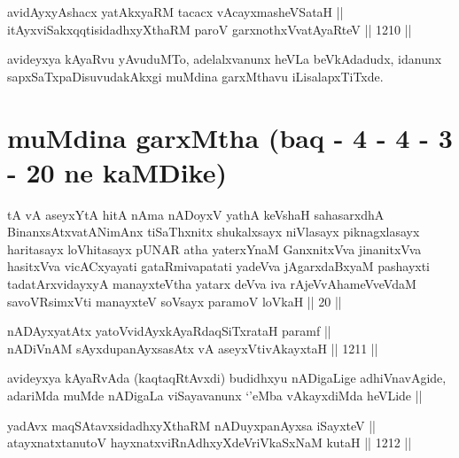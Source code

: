 
\begin{shl}
avidAyxyAshacx yatAkxyaRM tacacx vAcayxmasheVSataH || \\
itAyxviSakxqqtisidadhxyXthaRM paroV garxnothxV\s vatAyaRteV ||  1210 ||  
\end{shl}

\begin{artha}
avideyxya kAyaRvu yAvuduMTo, adelalxvanunx heVLa beVkAdadudx, idanunx sapxSaTxpaDisuvudakAkxgi muMdina garxMthavu iLisalapxTiTxde.
\end{artha}

\section*{muMdina garxMtha (baq - 4 - 4 - 3 - 20 ne kaMDike)}

\begin{shl}
tA vA aseyxYtA hitA nAma nADoyxV yathA keVshaH sahasarxdhA BinanxsAtxvatANimAnx tiSaThxnitx shukalxsayx niVlasayx piknagxlasayx haritasayx loVhitasayx pUNAR atha yaterxYnaM GanxnitxVva jinanitxVva hasitxVva vicACxyayati gataRmivapatati yadeVva jAgarxdaBxyaM pashayxti tadatArxvidayxyA manayxteV\s tha yatarx deVva iva rAjeVvAhameVveVdaM savoVR\s simxVti manayxteV soV\s sayx paramoV loVkaH || 20 ||
\end{shl}



\begin{shl}
nADAyxyatAtx yatoV\s vidAyxkAyaRdaqSiTxrataH paramf || \\
nADiVnAM sAyxdupanAyxsasAtx vA aseyxVtivAkayxtaH ||  1211 ||  
\end{shl}

\begin{artha}
avideyxya kAyaRvAda (kaqtaqRtAvxdi) budidhxyu nADigaLige adhiVnavAgide, adariMda muMde nADigaLa viSayavanunx `\stext'eMba vAkayxdiMda heVLide ||
\end{artha}


\begin{shl}
yadAvx maqSAtavxsidadhxyXthaRM nADuyxpanAyxsa iSayxteV || \\
atayxnatxtanutoV hayxnatxviRnAdhxyXdeVriVkaSxNaM kutaH ||  1212 ||  
\end{shl}

